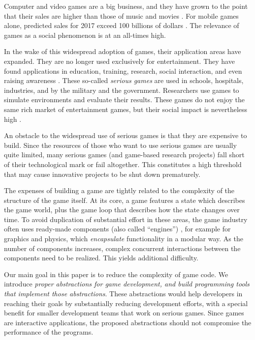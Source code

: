 Computer and video games are a big business, and they have grown to the point that their sales are higher than those of music and movies \cite{ESAreport}. For mobile games alone, predicted sales for 2017 exceed 100 billions of dollars \cite{GLOBAL:GAMES:INVESTMENT:REVIEW:2014} . The relevance of games as a social phenomenon is at an all-times high. %

In the wake of this widespread adoption of games, their application areas have expanded. They are no longer used exclusively for entertainment. They have found applications in education, training, research, social interaction, and even raising awareness  \cite{bogost2007persuasive,seriousgameslist}. These so-called \textit{serious games} are used in schools, hospitals, industries, and by the military and the government. Researchers use games to simulate environments and evaluate their results. These games do not enjoy the same rich market of entertainment games, but their social impact is nevertheless high \cite{michael2005serious}.

An obstacle to the widespread use of serious games is that they are expensive to build. Since the resources of those who want to use serious games are usually quite limited, many serious games (and game-based research projects) fall short of their technological mark or fail altogether. This constitutes a high threshold that may cause innovative projects to be shut down prematurely.

The expenses of building a game are tightly related to the complexity of the structure of the game itself. At its core, a game features a state which describes the game world, plus the game loop that describes how the state changes over time. To avoid duplication of substantial effort in these areas, the game industry often uses ready-made components (also called ``engines'') \cite{gregory2009game}, for example for graphics and physics, which \textit{encapsulate} functionality in a modular way. As the number of components increases, complex concurrent \cite{bilas2002data} interactions between the components need to be realized. This yields additional difficulty.

Our main goal in this paper is to reduce the complexity of game code. We introduce \textit{proper abstractions for game development, and build programming tools that implement those abstractions}. These abstractions would help developers in reaching their goals by substantially reducing development efforts, with a special benefit for smaller development teams that work on serious games. Since games are interactive applications, the proposed abstractions should not compromise the performance of the programs.


